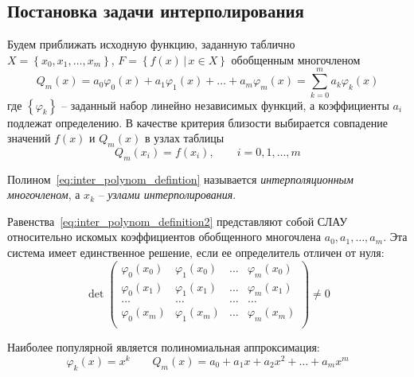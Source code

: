 \subsection{Постановка задачи интерполирования}
Будем приближать исходную функцию, заданную таблично $\displaystyle X = \left\{x_0, x_1,\dots,x_m\right\},\,F = \left\{f(x)\,|\, x \in X\right\}$
обобщенным многочленом
\begin{equation}
    Q_m(x) = a_0 \varphi_0(x) + a_1 \varphi_1(x) + \dots + a_m \varphi_m(x) = \sum_{k=0}^m a_k\varphi_k(x)\label{eq:inter_polynom_defintion}
\end{equation}
где $\left\{ \varphi_k \right\}$ -- заданный набор линейно независимых функций, а коэффициенты $a_i$ подлежат определению. В
качестве критерия близости выбирается совпадение значений $f(x)$ и $Q_m(x)$ в узлах таблицы
\begin{equation}
    Q_m(x_i) = f(x_i), \qquad i = 0,1,\dots,m\label{eq:inter_polynom_definition2}
\end{equation}
\begin{definition}
    Полином~\eqref{eq:inter_polynom_defintion} называется \emph{интерполяционным многочленом}, а $x_k$ -- \emph{узлами
    интерполирования}.
\end{definition}

Равенства~\eqref{eq:inter_polynom_definition2} представляют собой СЛАУ относительно искомых коэффициентов обобщенного
многочлена $a_0, a_1, \dots, a_m$. Эта система имеет единственное решение, если ее определитель отличен от нуля:
\begin{equation*}
    \det
    \begin{pmatrix}
        \varphi_0(x_0) & \varphi_1(x_0) & \dots & \varphi_m(x_0) \\
        \varphi_0(x_1) & \varphi_1(x_1) & \dots & \varphi_m(x_1) \\
        \dots          & \dots          & \dots & \dots          \\
        \varphi_0(x_m) & \varphi_1(x_m) & \dots & \varphi_m(x_m) \\
    \end{pmatrix}
    \neq 0
\end{equation*}

Наиболее популярной является полиномиальная аппроксимация:
\begin{equation*}
    \varphi_k(x) = x^k \qquad Q_m(x) = a_0 + a_1 x + a_2 x^2 + \dots + a_m x^m
\end{equation*}

